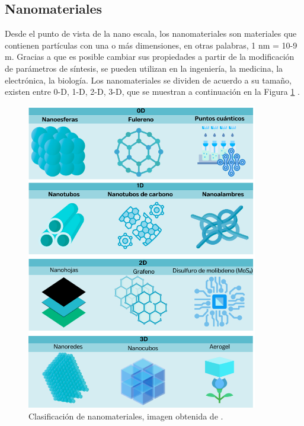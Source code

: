 \documentclass[12pt]{article}
\begin{document}
    \subsection{Nanomateriales}
    Desde el punto de vista de la nano escala, los nanomateriales son materiales que contienen partículas con una o más dimensiones, en otras palabras, 1 nm = 10-9 m. Gracias a que es posible cambiar sus propiedades a partir de la modificación de parámetros de síntesis, se pueden utilizan en la ingeniería, la medicina, la electrónica, la biología. Los nanomateriales se dividen de acuerdo a su tamaño, existen entre 0-D, 1-D, 2-D, 3-D, que se muestran a continuación en la Figura \ref{fig:Nanomateriales_ imagen} \cite{IEEEreferencias:Ref9,IEEEreferencias:NANO1, IEEEreferencias:NANO2}.
    
     
\begin{figure}[H]
        	\begin{center}
         		\includegraphics[width = 0.9\textwidth]{Imagenes/Nanomateriales_ imagen.png}
         		\caption{Clasificación de nanomateriales, imagen obtenida de \cite{IEEEreferencias:NANO2}.}
           \label{fig:Nanomateriales_ imagen} 
           
        	\end{center} 
        \end{figure}
\end{document}
